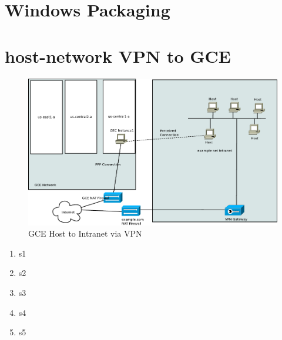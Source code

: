 \section{Windows Packaging}

\section{host-network VPN to GCE}
\begin{figure}[H]
\caption{GCE Host to Intranet via VPN}
\label{fig:GCE-Host-to-Intranet-via-VPN}
\begin{center}
\includegraphics[scale=0.65]{dia/gce-host-network-vpn.pdf}
\end{center}
\end{figure}

\begin{enumerate}
\item s1
\item s2
\item s3
\item s4
\item s5
\end{enumerate}
